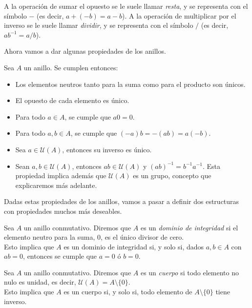 A la operación de sumar el opuesto se le suele llamar \textit{resta}, y se representa con el símbolo $-$ (es decir, $a + (-b) = a - b$). A la operación de multiplicar por el inverso se le suele llamar \textit{dividir}, y se representa con el símbolo $/$ (es decir, $ab^{-1} = a/b$).

Ahora vamos a dar algunas propiedades de los anillos.

\begin{proposicion}
	Sea $A$ un anillo. Se cumplen entonces:
	
	\begin{itemize}
		\item Los elementos neutros tanto para la suma como para el producto son únicos.
		
		\item El opuesto de cada elemento es único.
		
		\item Para todo $a \in A$, se cumple que $a0 = 0$.
		
		\item Para todo $a, b \in A$, se cumple que $(-a)b = -(ab) = a(-b)$.
		
		\item Sea $a \in \mathcal{U}(A)$, entonces su inverso es único.
		
		\item Sean $a, b \in \mathcal{U}(A)$, entonces $ab \in \mathcal{U}(A)$ y $(ab)^{-1} = b^{-1}a^{-1}$. Esta propiedad implica además que $\mathcal{U}(A)$ es un grupo, concepto que explicaremos más adelante.
	\end{itemize}
\end{proposicion}

Dadas estas propiedades de los anillos, vamos a pasar a definir dos estructuras con propiedades muchos más deseables.

\begin{definicion}
	Sea $A$ un anillo conmutativo. Diremos que $A$ es un \textit{dominio de integridad} si el elemento neutro para la suma, $0$, es el único divisor de cero.\\
	
	Esto implica que $A$ es un dominio de integridad si, y solo si, dados $a, b \in A$ con $ab = 0$, entonces se cumple que $a = 0$ ó $b = 0$.
\end{definicion}

\begin{definicion}
	Sea $A$ un anillo conmutativo. Diremos que $A$ es un \textit{cuerpo} si todo elemento no nulo es unidad, es decir, $\mathcal{U}(A) = A \setminus \{0\}$.\\
	
	Esto implica que $A$ es un cuerpo si, y solo si, todo elemento de $A \setminus \{0\}$ tiene inverso.
\end{definicion}

